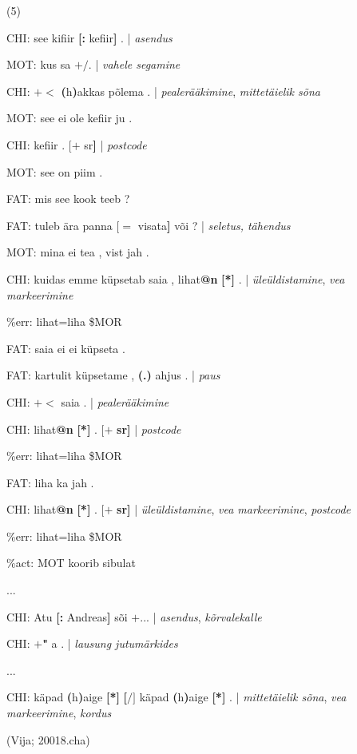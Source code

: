 \documentclass[12pt]{article}
\begin{document}
(5)
\begin{description}
    \item*CHI:   see kifiir \textbf{[:} kefiir\textbf{]} . | \emph{asendus}
    \item*MOT:   kus sa $\pmb{+/}$. | \emph{vahele segamine}
    \item*CHI:   $\pmb{+<}$ \textbf{(}h\textbf{)}akkas põlema . | \emph{pealerääkimine}, \emph{mittetäielik sõna}
    \item*MOT:   see ei ole kefiir ju .
    \item*CHI:   kefiir . $\pmb{[+}$ sr\textbf{]} | \emph{postcode}
    \item*MOT:   see on piim .
    \item*FAT:   mis see kook teeb ?
    \item*FAT:   tuleb ära panna $\pmb{[=}$ visata\textbf{]} või ? | \emph{seletus, tähendus}
    \item*MOT:   mina ei tea , vist jah .
    \item*CHI:   kuidas emme küpsetab saia , lihat\textbf{@n} \textbf{[*]} . | \emph{üleüldistamine}, \emph{vea markeerimine}
    \item\%err:   lihat=liha \$MOR
    \item*FAT:   saia ei ei küpseta .
    \item*FAT:   kartulit küpsetame , \textbf{(.)} ahjus . | \emph{paus}
    \item*CHI:   $\pmb{+<}$ saia . | \emph{pealerääkimine}
    \item*CHI:   lihat\textbf{@n} \textbf{[*]} . $\pmb{[+}$ \textbf{sr]} | \emph{postcode}
    \item\%err:   lihat=liha \$MOR
    \item*FAT:   liha ka jah .
    \item*CHI:   lihat\textbf{@n} \textbf{[*]} . $\pmb{[+}$ \textbf{sr]} | \emph{üleüldistamine}, \emph{vea markeerimine}, \emph{postcode}
    \item\%err:   lihat=liha \$MOR
    \item\%act:   MOT koorib sibulat
    \item...
    \item*CHI:   Atu \textbf{[:} Andreas\textbf{]} sõi $\pmb{+...}$ | \emph{asendus}, \emph{kõrvalekalle}
    \item*CHI:   $\pmb{+}$\textbf{"} a . | \emph{lausung jutumärkides}
    \item...
    \item*CHI:   käpad \textbf{(}h\textbf{)}aige \textbf{[*]} \textbf{[$\pmb{/]}$} käpad \textbf{(}h\textbf{)}aige \textbf{[*]} . | \emph{mittetäielik sõna}, \emph{vea markeerimine}, \emph{kordus}
    \item (Vija; 20018.cha)
\end{description}
\end{document}

